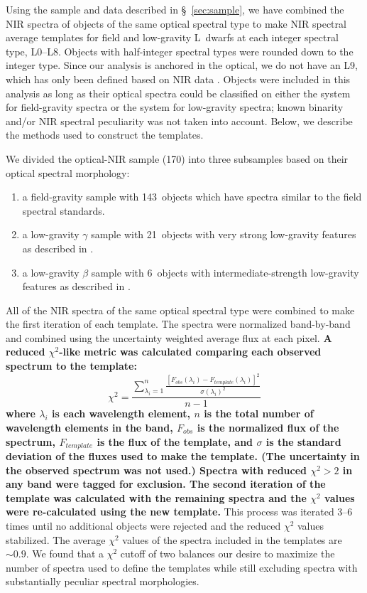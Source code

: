 \documentclass[12pt]{aastex6}
\newcommand{\sample}{170}
\newcommand{\optField}{143}
\newcommand{\optBeta}{6}
\newcommand{\optGamma}{21}
\begin{document}
Using the sample and data described in \S~\ref{sec:sample}, we have combined the NIR spectra of objects of the same optical spectral type to make NIR spectral average templates for field and low-gravity L~dwarfs at each integer spectral type, L0--L8. Objects with half-integer spectral types were rounded down to the integer type.
Since our analysis is anchored in the optical, we do not have an L9, which has only been defined based on NIR data \citep{K99,Geballe02}.
Objects were included in this analysis as long as their optical spectra could be classified on either the \citet{K99} system for field-gravity spectra or the \citet{Cruz09_lowg} system for low-gravity spectra; known binarity and/or NIR spectral peculiarity was not taken into account.
Below, we describe the methods used to construct the templates.

We divided the optical-NIR sample (\sample) into three subsamples based on their optical spectral morphology:
\begin{enumerate}
	\item a field-gravity sample with \optField~objects which have spectra similar to the \citet{K99} field spectral standards.
	\item a low-gravity $\gamma$ sample with \optGamma~objects with very strong low-gravity features as described in \citet{Cruz09_lowg}.
	\item a low-gravity $\beta$ sample with \optBeta~objects with intermediate-strength low-gravity features as described in \citet{Cruz09_lowg}.
\end{enumerate}

All of the NIR spectra of the same optical spectral type were combined to make the first iteration of each template.
The spectra were normalized band-by-band and combined using the uncertainty weighted average flux at each pixel.
\textbf{
A reduced $\chi^2$-like metric was calculated comparing each observed spectrum to the template:}
\begin{equation}
\chi^2=\frac{\sum_{\lambda_i=1}^{n} \frac{[F_{obs}(\lambda_i) - F_{template}(\lambda_i)]^2}{\sigma(\lambda_i)^2}}{n-1}
\end{equation}
\textbf{where $\lambda_i$ is each wavelength element, $n$ is the total number of wavelength elements in the band, $F_{obs}$ is the normalized flux of the spectrum, $F_{template}$ is the flux of the template, and $\sigma$ is the standard deviation of the fluxes used to make the template. (The uncertainty in the observed spectrum was not used.)
Spectra with reduced $\chi^2 > 2$ in any band were tagged for exclusion.
The second iteration of the template was calculated with the remaining spectra and the $\chi^2$ values were re-calculated using the new template.}
This process was iterated 3--6 times until no additional objects were rejected and the reduced $\chi^2$ values stabilized.
The average $\chi^2$ values of the spectra included in the templates are $\sim0.9$.
We found that a $\chi^2$ cutoff of two balances our desire to maximize the number of spectra used to define the templates while still excluding spectra with substantially peculiar spectral morphologies.
\end{document}
